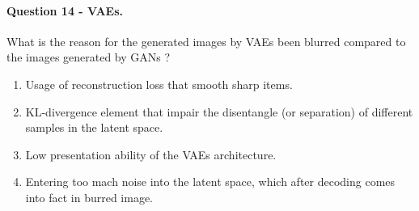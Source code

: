 \documentclass{article}
\begin{document}
\paragraph{ Question 14 - VAEs. } What is the reason for the generated images by VAEs been blurred compared to the images generated by GANs ?   
\begin{enumerate}
  \item Usage of reconstruction loss that smooth sharp items.   
  \item  KL-divergence element that impair the disentangle (or separation) of different samples in the latent space. 
  \item Low presentation ability of the VAEs architecture. 
  \item Entering too mach noise into the latent space, which after decoding comes into fact in burred image. 

\end{enumerate}
\end{document}
